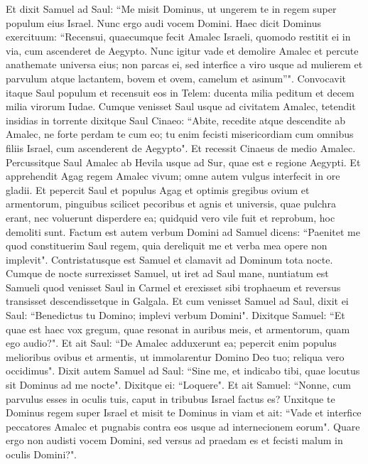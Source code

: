 \begin{biblechapter}  
\verse Et dixit Samuel ad Saul: “Me misit Dominus, ut ungerem te in regem super populum eius Israel. Nunc ergo audi vocem Domini. 
\verse Haec dicit Dominus exercituum: “Recensui, quaecumque fecit Amalec Israeli, quomodo restitit ei in via, cum ascenderet de Aegypto. 
\verse Nunc igitur vade et demolire Amalec et percute anathemate universa eius; non parcas ei, sed interfice a viro usque ad mulierem et parvulum atque lactantem, bovem et ovem, camelum et asinum”". 
\verse Convocavit itaque Saul populum et recensuit eos in Telem: ducenta milia peditum et decem milia virorum Iudae. 
\verse Cumque venisset Saul usque ad civitatem Amalec, tetendit insidias in torrente 
\verse dixitque Saul Cinaeo: “Abite, recedite atque descendite ab Amalec, ne forte perdam te cum eo; tu enim fecisti misericordiam cum omnibus filiis Israel, cum ascenderent de Aegypto". Et recessit Cinaeus de medio Amalec. 
\verse Percussitque Saul Amalec ab Hevila usque ad Sur, quae est e regione Aegypti.  
\verse Et apprehendit Agag regem Amalec vivum; omne autem vulgus interfecit in ore gladii. 
\verse Et pepercit Saul et populus Agag et optimis gregibus ovium et armentorum, pinguibus scilicet pecoribus et agnis et universis, quae pulchra erant, nec voluerunt disperdere ea; quidquid vero vile fuit et reprobum, hoc demoliti sunt. 
\verse Factum est autem verbum Domini ad Samuel dicens: 
\verse “Paenitet me quod constituerim Saul regem, quia dereliquit me et verba mea opere non implevit". Contristatusque est Samuel et clamavit ad Dominum tota nocte. 
\verse Cumque de nocte surrexisset Samuel, ut iret ad Saul mane, nuntiatum est Samueli quod venisset Saul in Carmel et erexisset sibi trophaeum et reversus transisset descendissetque in Galgala. 
\verse Et cum venisset Samuel ad Saul, dixit ei Saul: “Benedictus tu Domino; implevi verbum Domini". 
\verse Dixitque Samuel: “Et quae est haec vox gregum, quae resonat in auribus meis, et armentorum, quam ego audio?". 
\verse Et ait Saul: “De Amalec adduxerunt ea; pepercit enim populus melioribus ovibus et armentis, ut immolarentur Domino Deo tuo; reliqua vero occidimus". 
\verse Dixit autem Samuel ad Saul: “Sine me, et indicabo tibi, quae locutus sit Dominus ad me nocte". Dixitque ei: “Loquere". 
\verse Et ait Samuel: “Nonne, cum parvulus esses in oculis tuis, caput in tribubus Israel factus es? Unxitque te Dominus regem super Israel 
\verse et misit te Dominus in viam et ait: “Vade et interfice peccatores Amalec et pugnabis contra eos usque ad internecionem eorum". 
\verse Quare ergo non audisti vocem Domini, sed versus ad praedam es et fecisti malum in oculis Domini?". 

\end{biblechapter}
